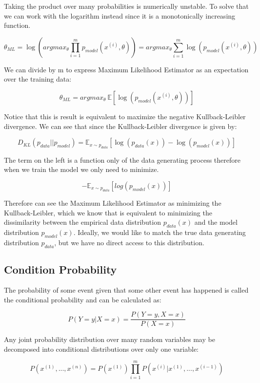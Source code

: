 \noindent Taking the product over many probabilities is numerically unstable. To solve that we can work with
the logarithm instead since it is a monotonically increasing function.

$$ \theta_{ML} = \log \left( argmax_{\theta} \prod_{i=1}^{m} p_{model} (x^{(i)}, \theta) \right) =  argmax_{\theta} \sum_{i=1}^{m} \log \left( p_{model} (x^{(i)}, \theta) \right)    $$

\noindent We can divide by m to express Maximum Likelihood Estimator as an expectation over the training data:

$$ \theta_{ML} = argmax_{\theta} ~ \mathbb{E} \left[ \log \left( p_{model} (x^{(i)}, \theta) \right) \right]    $$


\noindent Notice that this is result is equivalent to maximize the negative Kullback-Leibler divergence. We can see that
since the Kullback-Leibler divergence is given by:

$$ D_{KL} (p_{data} \vert \vert p_{model}) = \mathbb{E}_{x \sim p_{data}} \left[ \log(p_{data}(x)) - \log(p_{model}(x))  \right] $$

\noindent The term on the left is a function only of the data generating process therefore when we train the
model we only need to minimize.

$$- \mathbb{E}_{x \sim p_{data}} \left[ log \left( p_{model} (x) \right) \right] $$

\noindent Therefore can see the Maximum Likelihood Estimator as minimizing the Kullback-Leibler, which we know that is equivalent to minimizing the dissimilarity between the empirical data distribution $p_{data}(x)$ and the model distribution $p_{model}(x)$. Ideally, we would like to match the true data generating distribution $p_{data}$, but we have no direct access to this distribution.

\subsection{Condition Probability}

The probability of some event given that some other event has happened is called the conditional
probability and can be calculated as:

$$ P(Y=y \vert X=x) = \frac  {P(Y=y, X=x)} {P(X=x)} $$

\noindent Any joint probability distribution over many random variables may be decomposed into conditional
distributions over only one variable:

$$ P(x^{(1)}, ..., x^{(n)}) = P(x^{(1)}) \prod_{i=1}^{m} P(x^{(i)} \vert x^{(1)}, ..., x^{(i-1)})   $$

